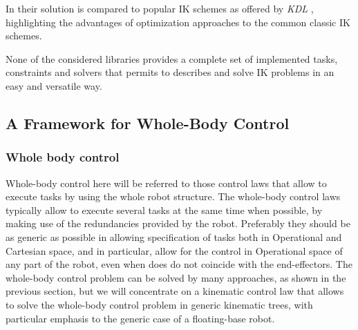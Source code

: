 In \cite{Beeson_undated-te} their solution is compared to popular IK schemes as offered by \emph{KDL} \cite{Smits2011-db}, highlighting the advantages of optimization approaches to the common classic IK schemes.

None of the considered libraries provides a complete set of implemented tasks, constraints and solvers that permits to describes and solve IK problems in an easy and versatile way.

\subsection{A Framework for Whole-Body Control}
\subsubsection{Whole body control}
\label{sec:walkman_wholebody}
Whole-body control here will be referred to those control laws that allow to execute tasks by using the whole robot structure. The whole-body control laws typically allow to execute several tasks at the same time when possible,  by making use of the redundancies provided by the robot. Preferably they should be as generic as possible in allowing specification of tasks both in Operational and Cartesian space, and in particular, allow for the control in Operational space of any part of the robot, even when does do not coincide with the end-effectors. The whole-body control  problem can be solved by many approaches, as shown in the previous section, but we will concentrate on a kinematic control law that allows to solve the whole-body control problem  in generic kinematic trees, with particular emphasis to the generic case of a floating-base robot.

